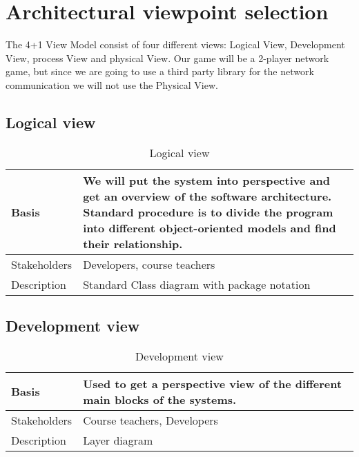 \newpage
\clearpage

\section{Architectural viewpoint selection}

The 4+1 View Model consist of four different views: Logical View, Development View, process View and physical View. Our game will be a 2-player network game, but since we are going to use a third party library for the network communication we will not use the Physical View.

\subsection{Logical view}

\begin{table}[h!]
\begin{tabular}{ | p{90pt} | p{270pt}  |}
\hline
Basis	 & We will put the system into perspective and get an overview of the software architecture. Standard procedure is to divide the program into different object-oriented models and find their relationship.  \\ \hline
Stakeholders & Developers, course teachers\\ \hline 
Description & Standard Class diagram with package notation \\ \hline

\end{tabular}

\caption{Logical view}

\end{table}

\vspace{-20pt}

\subsection{Development view}

\begin{table}[h!]
\begin{tabular}{ | p{90pt} | p{270pt}  |}
\hline
Basis	 & Used to get a perspective view of the different main blocks of the systems. \\ \hline
Stakeholders & Course teachers, Developers\\ \hline 
Description & Layer diagram \\ \hline

\end{tabular}

\caption{Development view}

\end{table}

